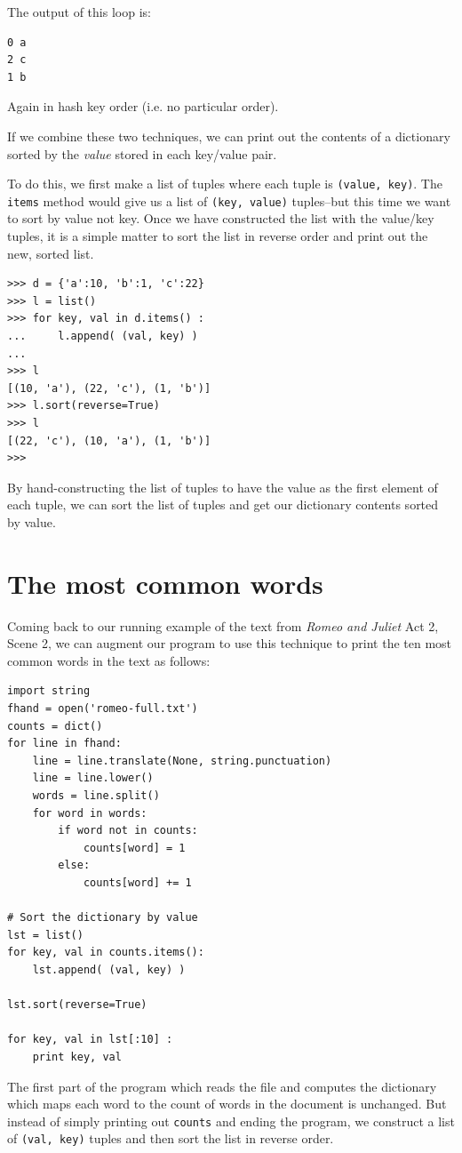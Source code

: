 \documentclass[10pt]{book}
\begin{document}
The output of this loop is:

\beforeverb
\begin{verbatim}
0 a
2 c
1 b
\end{verbatim}
\afterverb
%
Again in hash key order (i.e. no particular order).

If we combine these two techniques, we can print out the contents
of a dictionary sorted by the {\em value} stored in each key/value
pair.

To do this, we first make a list of tuples where each tuple is 
{\tt (value, key)}.  The {\tt items} method would give us a list of 
{\tt (key, value)} tuples--but this time we want to sort by value not key.
Once we have constructed the list with the value/key tuples, it is a simple
matter to sort the list in reverse order and print out the new, sorted list.

\beforeverb
\begin{verbatim}
>>> d = {'a':10, 'b':1, 'c':22}
>>> l = list()
>>> for key, val in d.items() :
...     l.append( (val, key) )
... 
>>> l
[(10, 'a'), (22, 'c'), (1, 'b')]
>>> l.sort(reverse=True)
>>> l
[(22, 'c'), (10, 'a'), (1, 'b')]
>>> 
\end{verbatim}
\afterverb
%
By hand-constructing the list of tuples to have the value as the first
element of each tuple, we can sort the list of tuples and get our dictionary
contents sorted by value.

\section{The most common words}

Coming back to our running example of the text from {\em Romeo and Juliet} 
Act 2, Scene 2, we can augment our program to use this technique to 
print the ten most common words in the text as follows:

\beforeverb
\begin{verbatim}
import string
fhand = open('romeo-full.txt')
counts = dict()
for line in fhand:
    line = line.translate(None, string.punctuation)
    line = line.lower()
    words = line.split()
    for word in words:
        if word not in counts:
            counts[word] = 1
        else:
            counts[word] += 1

# Sort the dictionary by value
lst = list()
for key, val in counts.items():
    lst.append( (val, key) )

lst.sort(reverse=True)

for key, val in lst[:10] :
    print key, val
\end{verbatim}
\afterverb
%
The first part of the program which reads the file and computes 
the dictionary which maps each word to the count of words in the 
document is unchanged.  But instead of simply printing out 
{\tt counts} and ending the program, we construct a list 
of {\tt (val, key)} tuples and then sort the list in reverse order.
\end{document}

